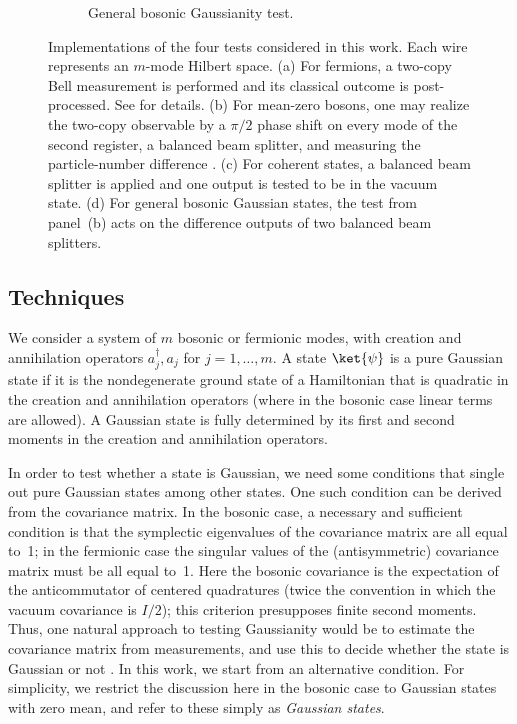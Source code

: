 \documentclass[11pt,a4paper]{article}
\numberwithin{equation}{section}
\newcommand{\1}{\mathbf{1}}
\begin{document}
\begin{figure}[t]
\begin{subfigure}[t]{0.47\linewidth}

\caption{General bosonic Gaussianity test.}
\label{fig:test-boson-general}
\end{subfigure}

\caption{
Implementations of the four tests considered in this work. Each wire represents an $m$-mode Hilbert space.
(a) For fermions, a two-copy Bell measurement is performed and its classical outcome is post-processed. See \cite{haug2026practical,tarabunga2026fermionic} for details.
(b) For mean-zero bosons, one may realize the two-copy observable by a $\pi/2$ phase shift on every mode of the second register, a balanced beam splitter, and measuring the particle-number difference \cite{hertz2019multicopy}.
(c) For coherent states, a balanced beam splitter is applied and one output is tested to be in the vacuum state.
(d) For general bosonic Gaussian states, the test from panel~(b) acts on the difference outputs of two balanced beam splitters.
}
\label{fig:tests}
\end{figure}

\subsection{Techniques}
We consider a system of $m$ bosonic or fermionic modes, with creation and annihilation operators $a_j^\dagger, a_j$ for $j = 1,\dots,m$. A state $\ket{\psi}$ is a pure Gaussian state if it is the nondegenerate ground state of a Hamiltonian that is quadratic in the creation and annihilation operators (where in the bosonic case linear terms are allowed).
A Gaussian state is fully determined by its first and second moments in the creation and annihilation operators.

In order to test whether a state is Gaussian, we need some conditions that single out pure Gaussian states among other states.
One such condition can be derived from the covariance matrix. In the bosonic case, a necessary and sufficient condition is that the symplectic eigenvalues of the covariance matrix are all equal to~1; in the fermionic case the singular values of the (antisymmetric) covariance matrix must be all equal to~1.
Here the bosonic covariance is the expectation of the anticommutator of centered quadratures (twice the convention in which the vacuum covariance is $I/2$); this criterion presupposes finite second moments. Thus, one natural approach to testing Gaussianity would be to estimate the covariance matrix from measurements, and use this to decide whether the state is Gaussian or not \cite{bittel2025optimal,girardi2025gaussian}.
In this work, we start from an alternative condition. For simplicity, we restrict the discussion here in the bosonic case to Gaussian states with zero mean, and refer to these simply as \emph{Gaussian states}.
\end{document}
